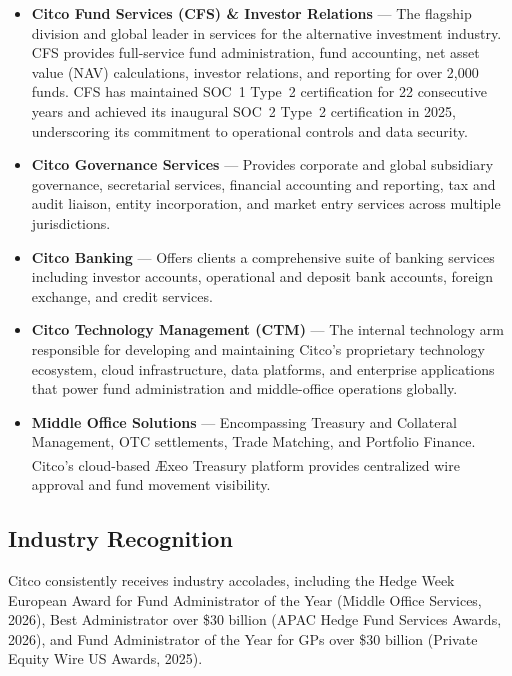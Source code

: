 \begin{itemize}
    \item \textbf{Citco Fund Services (CFS) \& Investor Relations} --- The flagship division and global leader in services for the alternative investment industry. CFS provides full-service fund administration, fund accounting, net asset value (NAV) calculations, investor relations, and reporting for over 2,000 funds. CFS has maintained SOC~1 Type~2 certification for 22 consecutive years and achieved its inaugural SOC~2 Type~2 certification in 2025, underscoring its commitment to operational controls and data security.

    \item \textbf{Citco Governance Services} --- Provides corporate and global subsidiary governance, secretarial services, financial accounting and reporting, tax and audit liaison, entity incorporation, and market entry services across multiple jurisdictions.

    \item \textbf{Citco Banking} --- Offers clients a comprehensive suite of banking services including investor accounts, operational and deposit bank accounts, foreign exchange, and credit services.

    \item \textbf{Citco Technology Management (CTM)} --- The internal technology arm responsible for developing and maintaining Citco's proprietary technology ecosystem, cloud infrastructure, data platforms, and enterprise applications that power fund administration and middle-office operations globally.

    \item \textbf{Middle Office Solutions} --- Encompassing Treasury and Collateral Management, OTC settlements, Trade Matching, and Portfolio Finance. Citco's cloud-based \AE xeo\textsuperscript{\textregistered} Treasury platform provides centralized wire approval and fund movement visibility.
\end{itemize}

\subsection{Industry Recognition}

Citco consistently receives industry accolades, including the Hedge Week European Award for Fund Administrator of the Year (Middle Office Services, 2026), Best Administrator over \$30 billion (APAC Hedge Fund Services Awards, 2026), and Fund Administrator of the Year for GPs over \$30 billion (Private Equity Wire US Awards, 2025).

